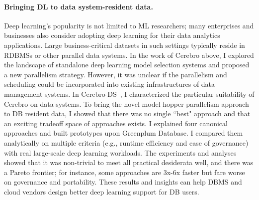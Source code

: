 \documentclass[letterpaper]{article}
\begin{document}
\paragraph{Bringing DL to data system-resident data.}
Deep learning's popularity is not limited to ML researchers; many enterprises and businesses also consider adopting deep learning for their data analytics applications. Large business-critical
datasets in such settings typically reside in RDBMSs or other parallel data
systems.  In the work of Cerebro above, I explored the landscape of standalone deep learning model selection systems and proposed a new parallelism strategy. However, it was unclear if the parallelism and scheduling could be incorporated into existing infrastructures of data management systems. In Cerebro-DS~\cite{cerebro-ds}, I characterized the particular suitability of Cerebro on data systems. To bring the novel model hopper parallelism approach to DB resident data, I showed that there was no single ``best" approach and
that an exciting tradeoff space of approaches exists. I explained four
canonical approaches and built prototypes upon Greenplum Database. I compared them analytically on multiple criteria (e.g., runtime
efficiency and ease of governance) with real large-scale deep learning workloads. The experiments and analyses showed
that it was non-trivial to meet all practical desiderata well, and there was
a Pareto frontier; for instance, some approaches are 3x-6x faster but
fare worse on governance and portability. These results and insights
can help DBMS and cloud vendors design better deep learning support for DB
users.
\end{document}
